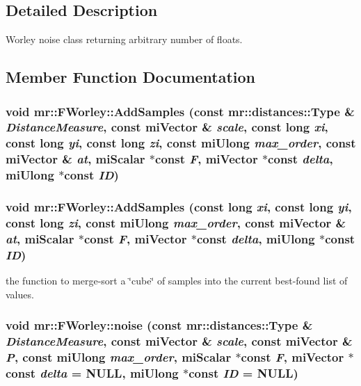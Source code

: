 \subsection{Detailed Description}
Worley noise class returning arbitrary number of floats. 



\subsection{Member Function Documentation}
\subsubsection{\setlength{\rightskip}{0pt plus 5cm}void mr::FWorley::Add\-Samples (const {\bf mr::distances::Type} \& {\em Distance\-Measure}, const mi\-Vector \& {\em scale}, const long {\em xi}, const long {\em yi}, const long {\em zi}, const mi\-Ulong {\em max\_\-order}, const mi\-Vector \& {\em at}, mi\-Scalar $\ast$const {\em F}, mi\-Vector $\ast$const {\em delta}, mi\-Ulong $\ast$const {\em ID})\hspace{0.3cm}{\tt  [static, protected]}}\label{classmr_1_1FWorley_f1}


\subsubsection{\setlength{\rightskip}{0pt plus 5cm}void mr::FWorley::Add\-Samples (const long {\em xi}, const long {\em yi}, const long {\em zi}, const mi\-Ulong {\em max\_\-order}, const mi\-Vector \& {\em at}, mi\-Scalar $\ast$const {\em F}, mi\-Vector $\ast$const {\em delta}, mi\-Ulong $\ast$const {\em ID})\hspace{0.3cm}{\tt  [static, protected]}}\label{classmr_1_1FWorley_f0}


the function to merge-sort a \char`\"{}cube\char`\"{} of samples into the current best-found list of values. 
\subsubsection{\setlength{\rightskip}{0pt plus 5cm}void mr::FWorley::noise (const {\bf mr::distances::Type} \& {\em Distance\-Measure}, const mi\-Vector \& {\em scale}, const mi\-Vector \& {\em P}, const mi\-Ulong {\em max\_\-order}, mi\-Scalar $\ast$const {\em F}, mi\-Vector $\ast$const {\em delta} = NULL, mi\-Ulong $\ast$const {\em ID} = NULL)\hspace{0.3cm}{\tt  [inline, static]}}\label{classmr_1_1FWorley_e3}


